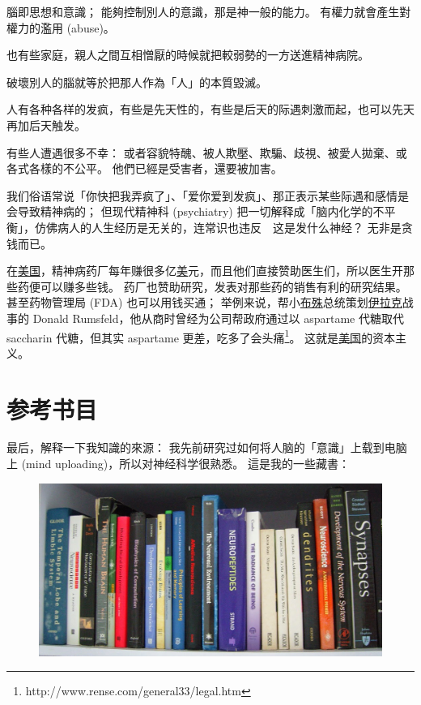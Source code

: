 \documentclass[12pt]{report}
\newcommand*\dashh{\,\,\textemdash\kern-1pt\textemdash\,\,}
\begin{document}
{腦即思想和意識； 能夠控制別人的意識，那是神一般的能力。 有權力就會產生對權力的濫用 (abuse)。

也有些家庭，親人之間互相憎厭的時候就把較弱勢的一方送進精神病院。

破壞別人的腦就等於把那人作為「人」的本質毀滅。

人有各种各样的发疯，有些是先天性的，有些是后天的际遇刺激而起，也可以先天再加后天触发。

有些人遭遇很多不幸： 或者容貌特醜、被人欺壓、欺騙、歧視、被愛人拋棄、或各式各樣的不公平。 他們已經是受害者，還要被加害。

我们俗语常说「你快把我弄疯了」、「爱你爱到发疯」、那正表示某些际遇和感情是会导致精神病的； 但现代精神科 (psychiatry) 把一切解释成「脑内化学的不平衡」，仿佛病人的人生经历是无关的，连常识也违反 \dashh 这是发什么神经？ 无非是贪钱而已。

在\uline{美国}，精神病药厂每年赚很多亿\uline{美}元，而且他们直接赞助医生们，所以医生开那些药便可以赚多些钱。 药厂也赞助研究，发表对那些药的销售有利的研究结果。 甚至药物管理局 (FDA) 也可以用钱买通； 举例来说，帮小\uline{布殊}总统策划\uline{伊拉克}战事的 Donald Rumsfeld，他从商时曾经为公司帮政府通过以 aspartame 代糖取代 saccharin 代糖，但其实 aspartame 更差，吃多了会头痛\footnote{http://www.rense.com/general33/legal.htm}。 这就是\uline{美国}的资本主义。

\section{参考书目}

最后，解释一下我知識的來源： 我先前研究过如何将人脑的「意識」上载到电脑上 (mind uploading)，所以对神经科学很熟悉。 這是我的一些藏書：

\begin{figure}[H]
\centering
\includegraphics[scale=0.5]{neuro-books1.jpg}
\end{figure}

}
\end{document}
